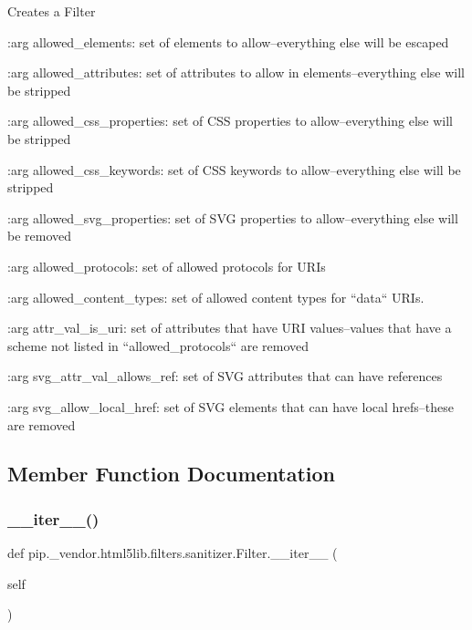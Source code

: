 \begin{DoxyVerb}Creates a Filter

:arg allowed_elements: set of elements to allow--everything else will
    be escaped

:arg allowed_attributes: set of attributes to allow in
    elements--everything else will be stripped

:arg allowed_css_properties: set of CSS properties to allow--everything
    else will be stripped

:arg allowed_css_keywords: set of CSS keywords to allow--everything
    else will be stripped

:arg allowed_svg_properties: set of SVG properties to allow--everything
    else will be removed

:arg allowed_protocols: set of allowed protocols for URIs

:arg allowed_content_types: set of allowed content types for ``data`` URIs.

:arg attr_val_is_uri: set of attributes that have URI values--values
    that have a scheme not listed in ``allowed_protocols`` are removed

:arg svg_attr_val_allows_ref: set of SVG attributes that can have
    references

:arg svg_allow_local_href: set of SVG elements that can have local
    hrefs--these are removed\end{DoxyVerb}
 

\subsection{Member Function Documentation}
\mbox{\label{classpip_1_1__vendor_1_1html5lib_1_1filters_1_1sanitizer_1_1Filter_a2c0ff9addc9b4172b0de3226dbeb8d71}} 
\subsubsection{\texorpdfstring{\+\_\+\+\_\+iter\+\_\+\+\_\+()}{\_\_iter\_\_()}}
{\footnotesize\ttfamily def pip.\+\_\+vendor.\+html5lib.\+filters.\+sanitizer.\+Filter.\+\_\+\+\_\+iter\+\_\+\+\_\+ (\begin{DoxyParamCaption}\item[{}]{self }\end{DoxyParamCaption})}

